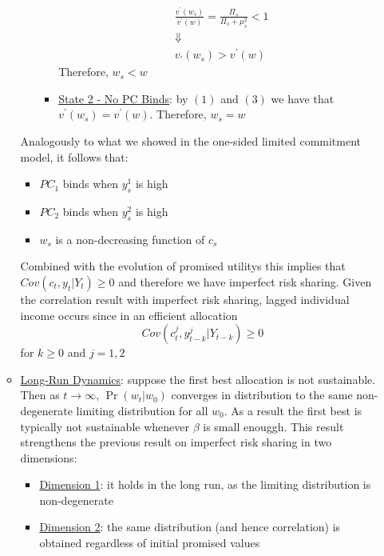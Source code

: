 \documentclass{article}
\begin{document}
\begin{itemize}
\begin{itemize}
\begin{itemize}
\begin{itemize}
\begin{gather*}
                    \frac{v^{'}(w_{s})}{v^{'}(w)} = \frac{\Pi_{s}}{\Pi_{s} + \mu_{s}^{2}} < 1 \\
                    \Downarrow \\
                    v_{'}(w_{s}) > v^{'}(w)
                \end{gather*}
                Therefore, $w_{s} < w$
                \item  \underline{State 2 - No PC Binds}: by $(1)$ and $(3)$ we have that $v^{'}(w_{s}) = v^{'}(w)$. Therefore, $w_{s} = w$
            \end{itemize}
        \end{itemize}
        Analogously to what we showed in the one-sided limited commitment model, it follows that:
        \begin{itemize}
            \item  $PC_{1}$ binds when $y_{s}^{1}$ is high
            \item  $PC_{2}$ binds when $y_{s}^{2}$ is high
            \item  $w_{s}$ is a non-decreasing function of $c_{s}$
        \end{itemize}
        Combined with the evolution of promised utilitys this implies that $Cov(c_{t}, y_{t} | Y_{t}) \geq 0$ and therefore we have imperfect risk sharing. Given the correlation result with imperfect risk sharing, lagged individual income occurs since in an efficient allocation $$Cov(c_{t}^{j}, y_{t-k}^{j} | Y_{t-k}) \geq 0$$ for $k \geq 0$ and $j = 1,2$
        \item \underline{Long-Run Dynamics}: suppose the first best allocation is not sustainable. Then as $t \rightarrow \infty$, $\Pr(w_{t} | w_{0})$ converges in distribution to the same non-degenerate limiting distribution for all $w_{0}$.
        As a result the first best is typically not sustainable whenever $\beta$ is small enouggh. This result strengthens the previous result on imperfect risk sharing in two dimensions:
        \begin{itemize}
            \item  \underline{Dimension 1}: it holds in the long run, as the limiting distribution is non-degenerate
            \item  \underline{Dimension 2}: the same distribution (and hence correlation) is obtained regardless of initial promised values
        \end{itemize}
    \end{itemize}
\end{itemize}
\end{document}
